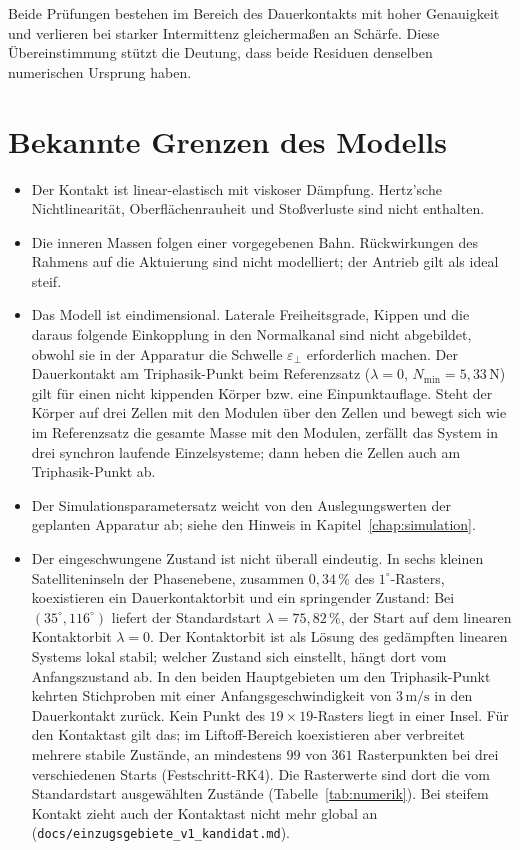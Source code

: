 \documentclass[12pt,a4paper]{report}
\begin{document}
Beide Prüfungen bestehen im Bereich des Dauerkontakts mit hoher
Genauigkeit und verlieren bei starker Intermittenz gleichermaßen an
Schärfe. Diese Übereinstimmung stützt die Deutung, dass beide Residuen
denselben numerischen Ursprung haben.

\section{Bekannte Grenzen des Modells}
\label{sec:anh-grenzen}

\begin{itemize}
\item Der Kontakt ist linear-elastisch mit viskoser Dämpfung. Hertz'sche
      Nichtlinearität, Oberflächenrauheit und Stoßverluste sind nicht
      enthalten.
\item Die inneren Massen folgen einer vorgegebenen Bahn. Rückwirkungen
      des Rahmens auf die Aktuierung sind nicht modelliert; der Antrieb
      gilt als ideal steif.
\item Das Modell ist eindimensional. Laterale Freiheitsgrade, Kippen und
      die daraus folgende Einkopplung in den Normalkanal sind nicht
      abgebildet, obwohl sie in der Apparatur die Schwelle
      $\varepsilon_{\perp}$ erforderlich machen. Der Dauerkontakt am
      Triphasik-Punkt beim Referenzsatz ($\lambda = 0$,
      $N_{\min} = 5{,}33\,\mathrm{N}$) gilt für einen nicht kippenden
      Körper bzw. eine Einpunktauflage. Steht der Körper auf drei Zellen
      mit den Modulen über den Zellen und bewegt sich wie im
      Referenzsatz die gesamte Masse mit den Modulen, zerfällt das System
      in drei synchron laufende Einzelsysteme; dann heben die Zellen auch
      am Triphasik-Punkt ab.
\item Der Simulationsparametersatz weicht von den Auslegungswerten der
      geplanten Apparatur ab; siehe den Hinweis in
      Kapitel~\ref{chap:simulation}.
\item Der eingeschwungene Zustand ist nicht überall eindeutig. In sechs
      kleinen Satelliteninseln der Phasenebene, zusammen $0{,}34\,\%$ des
      $1^\circ$-Rasters, koexistieren ein Dauerkontaktorbit und ein
      springender Zustand: Bei $(35^\circ, 116^\circ)$ liefert der
      Standardstart $\lambda = 75{,}82\,\%$, der Start auf dem linearen
      Kontaktorbit $\lambda = 0$. Der Kontaktorbit ist als Lösung des
      gedämpften linearen Systems lokal stabil; welcher Zustand sich
      einstellt, hängt dort vom Anfangszustand ab. In den beiden
      Hauptgebieten um den Triphasik-Punkt kehrten Stichproben mit einer
      Anfangsgeschwindigkeit von $3\,\mathrm{m/s}$ in den Dauerkontakt
      zurück. Kein Punkt des $19\times19$-Rasters liegt in einer Insel.
      Für den Kontaktast gilt das; im Liftoff-Bereich koexistieren aber
      verbreitet mehrere stabile Zustände, an mindestens $99$ von $361$
      Rasterpunkten bei drei verschiedenen Starts (Festschritt-RK4). Die Rasterwerte sind
      dort die vom Standardstart ausgewählten Zustände
      (Tabelle~\ref{tab:numerik}). Bei steifem Kontakt zieht auch der
      Kontaktast nicht mehr global an
      (\texttt{docs/einzugsgebiete\_v1\_kandidat.md}).
\end{itemize}
\end{document}
